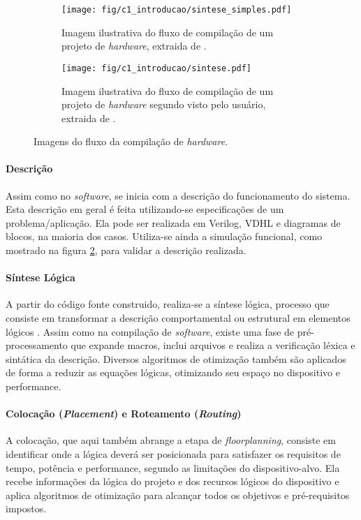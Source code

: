 \documentclass[11pt,a4paper,oneside]{book}
\begin{document}
\begin{figure}[h]
	\centering
       	\begin{subfigure}[b]{0.4\textwidth}
       		\centering
		\texttt{[image: fig/c1\_introducao/sintese\_simples.pdf]}
		\caption{Imagem ilustrativa do fluxo de compilação de um projeto de \textit{hardware}, extraida de \cite{Hauck2007}.}
		\label{fig:sintese_simples}
	\end{subfigure}\quad
	\begin{subfigure}[b]{0.55\textwidth}
		\centering
		\texttt{[image: fig/c1\_introducao/sintese.pdf]}
		\caption{Imagem ilustrativa do fluxo de compilação de um projeto de \textit{hardware} segundo visto pelo usuário, extraida de \cite{Hauck2007}.}
		\label{fig:sintese_user}
	\end{subfigure}
	\caption{Imagens do fluxo da compilação de \textit{hardware}.}
	\label{fig:sintese}
\end{figure}

\paragraph{Descrição}
Assim como no \textit{software},  se inicia com a descrição do funcionamento do sistema.
Esta descrição em geral é feita utilizando-se especificações de um problema/aplicação.
Ela pode ser realizada em Verilog, VDHL e diagramas de blocos, na maioria dos casos.
Utiliza-se ainda a simulação funcional, como mostrado na figura \ref{fig:sintese_user}, para validar a descrição realizada.

\paragraph{Síntese Lógica}
A partir do código fonte construido, realiza-se a síntese lógica, processo que consiste em transformar a descrição comportamental ou estrutural em elementos lógicos \cite{Thomas1996, Ashenden2008}.
Assim como na compilação de \textit{software}, existe uma fase de pré-processamento que expande macros, inclui arquivos e realiza a verificação léxica e sintática da descrição.
Diversos algoritmos de otimização também são aplicados de forma a reduzir as equações lógicas, otimizando seu espaço no dispositivo e performance.

\paragraph{Colocação (\textit{Placement}) e Roteamento (\textit{Routing})}
A colocação, que aqui também abrange a etapa de \textit{floorplanning}, consiste em identificar onde a lógica deverá ser posicionada para satisfazer os requisitos de tempo, potência e performance, segundo as limitações do dispositivo-alvo.
Ela recebe informações da lógica do projeto e dos recursos lógicos do dispositivo e aplica algoritmos de otimização para alcançar todos os objetivos e pré-requisitos impostos.
\end{document}
